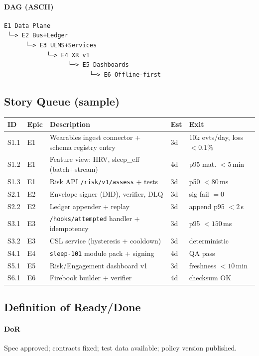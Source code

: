 \documentclass[11pt]{article}
\theoremstyle{plain}
\begin{document}
\paragraph{DAG (ASCII)}
\begin{verbatim}
E1 Data Plane
 └─> E2 Bus+Ledger
      └─> E3 ULMS+Services
            └─> E4 XR v1
                  └─> E5 Dashboards
                        └─> E6 Offline-first
\end{verbatim}

\subsection{Story Queue (sample)}
\begin{center}
\begin{tabular}{l l p{7.8cm} l l}
\hline
ID & Epic & Description & Est & Exit \\
\hline
S1.1 & E1 & Wearables ingest connector + schema registry entry & 3d & 10k evts/day, loss $<0.1\%$ \\
S1.2 & E1 & Feature view: HRV, sleep\_eff (batch+stream) & 4d & p95 mat. $<5$\,min \\
S1.3 & E1 & Risk API \texttt{/risk/v1/assess} + tests & 3d & p50 $<80$\,ms \\
S2.1 & E2 & Envelope signer (DID), verifier, DLQ & 3d & sig fail $=0$ \\
S2.2 & E2 & Ledger appender + replay & 3d & append p95 $<2$\,s \\
S3.1 & E3 & \texttt{/hooks/attempted} handler + idempotency & 3d & p95 $<150$\,ms \\
S3.2 & E3 & CSL service (hysteresis + cooldown) & 3d & deterministic \\
S4.1 & E4 & \texttt{sleep-101} module pack + signing & 4d & QA pass \\
S5.1 & E5 & Risk/Engagement dashboard v1 & 3d & freshness $<10$\,min \\
S6.1 & E6 & Firebook builder + verifier & 4d & checksum OK \\
\hline
\end{tabular}
\end{center}

\subsection{Definition of Ready/Done}
\paragraph{DoR}
Spec approved; contracts fixed; test data available; policy version published.
\end{document}
